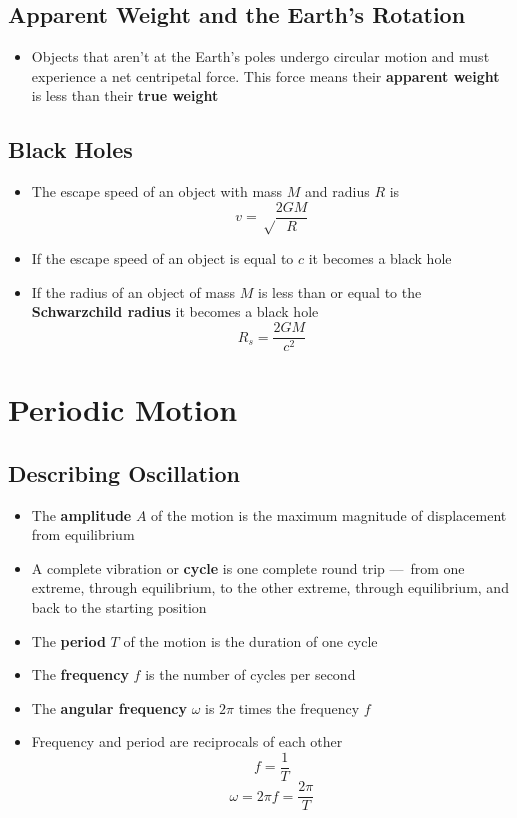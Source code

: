 \documentclass{article}
\begin{document}
\subsection{Apparent Weight and the Earth's Rotation}

\begin{itemize}
  \item Objects that aren't at the Earth's poles undergo circular motion and must experience a net centripetal force. This force means their \textbf{apparent weight} is less than their \textbf{true weight}
\end{itemize}

\subsection{Black Holes}

\begin{itemize}
  \item The escape speed of an object with mass $M$ and radius $R$ is \[v= \sqrt \frac {2GM} R\]

  \item If the escape speed of an object is equal to $c$ it becomes a black hole

  \item If the radius of an object of mass $M$ is less than or equal to the \textbf{Schwarzchild radius} it becomes a black hole \[R_s = \frac {2GM} {c^2}\]
\end{itemize}

\section{Periodic Motion}

\subsection{Describing Oscillation}

\begin{itemize}
  \item The \textbf{amplitude} $A$ of the motion is the maximum magnitude of displacement from equilibrium

  \item A complete vibration or \textbf{cycle} is one complete round trip — from one extreme, through equilibrium, to the other extreme, through equilibrium, and back to the starting position

  \item The \textbf{period} $T$ of the motion is the duration of one cycle

  \item The \textbf{frequency} $f$ is the number of cycles per second

  \item The \textbf{angular frequency} $\omega$ is $2\pi$ times the frequency $f$

  \item Frequency and period are reciprocals of each other \[f = \frac 1 T\] \[\omega = 2\pi f = \frac {2\pi} T\]
\end{itemize}
\end{document}
